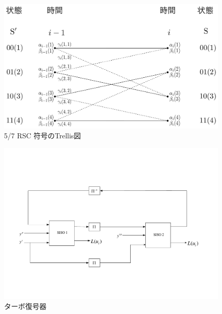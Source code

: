 \documentclass[20 pts]{article}
\begin{document}
	
	\begin{center}
	\begin{figure}
		\includegraphics[width=\textwidth]{figure3.pdf}
		\caption{5/7 RSC 符号のTrellis図}
		\end{figure}
	\end{center}
	
	\begin{center}
	\begin{figure}
		\includegraphics[width=\textwidth]{D1.pdf}
		\caption{ターボ復号器}
		\end{figure}
	\end{center}
\end{document}
